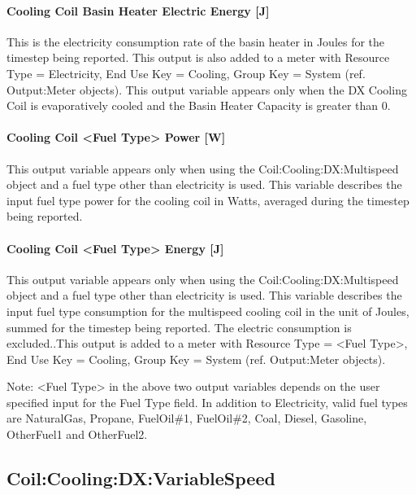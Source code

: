 \paragraph{Cooling Coil Basin Heater Electric Energy {[}J{]}}\label{cooling-coil-basin-heater-electric-energy-j}

This is the electricity consumption rate of the basin heater in Joules for the timestep being reported. This output is also added to a meter with Resource Type = Electricity, End Use Key = Cooling, Group Key = System (ref. Output:Meter objects). This output variable appears only when the DX Cooling Coil is evaporatively cooled and the Basin Heater Capacity is greater than 0.

\paragraph{Cooling Coil \textless{}Fuel Type\textgreater{} Power {[}W{]}}\label{cooling-coil-fuel-type-power-w}

This output variable appears only when using the Coil:Cooling:DX:Multispeed object and a fuel type other than electricity is used. This variable describes the input fuel type power for the cooling coil in Watts, averaged during the timestep being reported.

\paragraph{Cooling Coil \textless{}Fuel Type\textgreater{} Energy {[}J{]}}\label{cooling-coil-fuel-type-energy-j}

This output variable appears only when using the Coil:Cooling:DX:Multispeed object and a fuel type other than electricity is used. This variable describes the input fuel type consumption for the multispeed cooling coil in the unit of Joules, summed for the timestep being reported. The electric consumption is excluded..This output is added to a meter with Resource Type = \textless{}Fuel Type\textgreater{}, End Use Key = Cooling, Group Key = System (ref. Output:Meter objects).

Note: \textless{}Fuel Type\textgreater{} in the above two output variables depends on the user specified input for the Fuel Type field. In addition to Electricity, valid fuel types are NaturalGas, Propane, FuelOil\#1, FuelOil\#2, Coal, Diesel, Gasoline, OtherFuel1 and OtherFuel2.

\subsection{Coil:Cooling:DX:VariableSpeed}\label{coilcoolingdxvariablespeed}

